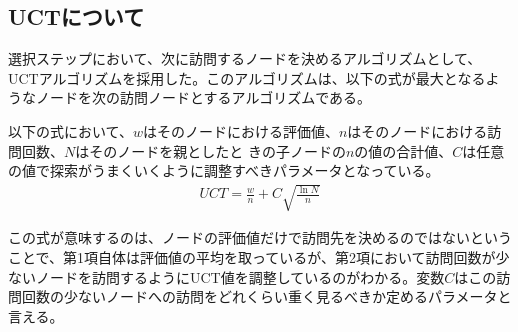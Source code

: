 \documentclass[10pt, a4paper]{jsarticle}
\begin{document}
\subsection{UCTについて}
選択ステップにおいて、次に訪問するノードを決めるアルゴリズムとして、UCTアルゴリズムを採用した。このアルゴリズムは、以下の式が最大となるようなノードを次の訪問ノードとするアルゴリズムである。
\par 以下の式において、$w$はそのノードにおける評価値、$n$はそのノードにおける訪問回数、$N$はそのノードを親としたと きの子ノードの$n$の値の合計値、$C$は任意の値で探索がうまくいくように調整すべきパラメータとなっている。
\begin{eqnarray}
    UCT = \frac{w}{n} + C\sqrt{\frac{\ln{N}}{n}}
\end{eqnarray}
\par
この式が意味するのは、ノードの評価値だけで訪問先を決めるのではないということで、第1項自体は評価値の平均を取っているが、第2項において訪問回数が少ないノードを訪問するようにUCT値を調整しているのがわかる。変数$C$はこの訪問回数の少ないノードへの訪問をどれくらい重く見るべきか定めるパラメータと言える。
\end{document}
